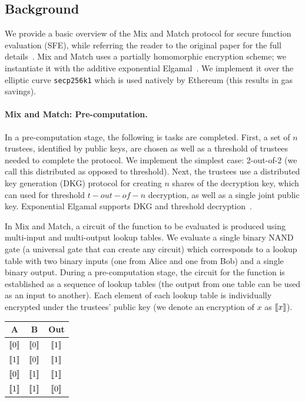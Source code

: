 \subsection{Background}

We provide a basic overview of the Mix and Match protocol for secure function evaluation (SFE), while referring the reader to the original paper for the full details~\cite{JJ00}. Mix and Match uses a partially homomorphic encryption scheme; we instantiate it with the additive exponential Elgamal~\cite{CGS97}. We implement it over the elliptic curve \texttt{secp256k1} which is used natively by Ethereum (this results in gas savings).

\paragraph{Mix and Match: Pre-computation.} 

In a pre-computation stage, the following is tasks are completed. First, a set of $n$ trustees, identified by public keys, are chosen as well as a threshold of trustees needed to complete the protocol. We implement the simplest case: 2-out-of-2 (we call this distributed as opposed to threshold). Next, the trustees use a distributed key generation (DKG) protocol for creating $n$ shares of the decryption key, which can used for threshold $t-out-of-n$ decryption, as well as a single joint public key. Exponential Elgamal supports DKG and threshold decryption~\cite{Ped91a}.

In Mix and Match, a circuit of the function to be evaluated is produced using multi-input and multi-output lookup tables. We evaluate a single binary NAND gate (a universal gate that can create any circuit) which corresponds to a lookup table with two binary inputs (one from Alice and one from Bob) and a single binary output. During a pre-computation stage, the circuit for the function is established as a sequence of lookup tables (the output from one table can be used as an input to another). Each element of each lookup table is individually encrypted under the trustees' public key (we denote an encryption of $x$ as $\llbracket x \rrbracket$). 

\begin{center}
\begin{tabular}{|c|c|c|}
  \hline
  A			& 	B			& 	Out   			\\ \hline
  $\llbracket 0 \rrbracket$ 	&	$\llbracket 0 \rrbracket$ 	& 	$\llbracket 1 \rrbracket$ 	\\ \hline
  $\llbracket 1 \rrbracket$ 	&	$\llbracket 0 \rrbracket$ 	&  	$\llbracket 1 \rrbracket$ 	\\ \hline
  $\llbracket 0 \rrbracket$ 	&	$\llbracket 1 \rrbracket$ 	& 	$\llbracket 1 \rrbracket$ 	\\ \hline
  $\llbracket 1 \rrbracket$ 	&	$\llbracket 1 \rrbracket$ 	&  	$\llbracket 0 \rrbracket$ 	\\ \hline
\end{tabular}
\end{center}


